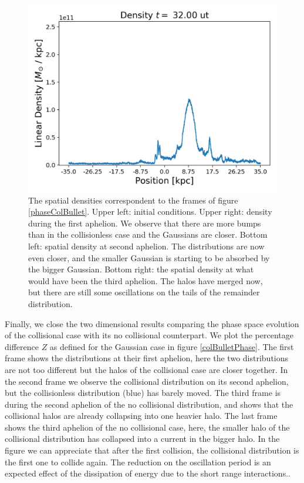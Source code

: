 \begin{figure}[h!]
    \includegraphics[scale=0.45]{imag/cBulletD80.png}
    \caption{The spatial densities correspondent to the frames of figure \ref{phaseColBullet}. Upper left: initial conditions. Upper right: density during the first aphelion. We observe that there are more bumps than in the collisionless case and the Gaussians are closer. Bottom left: spatial density at second aphelion. The distributions are now even closer, and the smaller Gaussian is starting to be absorbed by the bigger Gaussian. Bottom right: the spatial density at what would have been the third aphelion. The halos have merged now, but there are still some oscillations on the tails of the remainder distribution.}
    \label{densColBullet}
\end{figure}

\newpage

Finally, we close the two dimensional results comparing the phase space evolution of the collisional case with its no collisional counterpart.
We plot the percentage difference $Z$ as defined for the Gaussian case in figure \ref{colBulletPhase}.
The first frame shows the distributions at their first aphelion, here the two distributions are not too different but the halos of the collisional case are closer together.
In the second frame we observe the collisional distribution on its second aphelion, but the collisionless distribution (blue) has barely moved. The third frame is during the second aphelion of the no collisional distribution, and shows that the collisional halos are already collapsing into one heavier halo.
The last frame shows the third aphelion of the no collisional case, here, the smaller halo of the collisional distribution has collapsed into a current in the bigger halo.
In the figure we can appreciate that after the first collision, the collisional distribution is the first one to collide again. The reduction on the oscillation period is an expected effect of the dissipation of energy due to the short range interactions..

